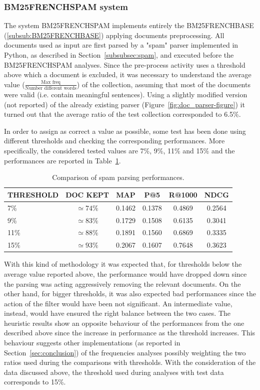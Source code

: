 \subsubsection{BM25FRENCHSPAM system}
\label{subsub:BM25FRENCHSPAM}
The system BM25FRENCHSPAM implements entirely the BM25FRENCHBASE (\ref{subsub:BM25FRENCHBASE}) applying documents preprocessing. All documents used as input are first parsed by a "spam" parser implemented in Python, as described in Section~\ref{subsubsec:spam}, and executed before the BM25FRENCHSPAM analyses. Since the pre-process activity uses a threshold above which a document is excluded, it was necessary to understand the average value (\(\frac{\text{Max freq}}{\text{Number different words}}\)) of the collection, assuming that most of the documents were valid (i.e. contain meaningful sentences). Using a slightly modified version (not reported) of the already existing parser (Figure~\ref{fig:doc_parser-figure}) it turned out that the average ratio of the test collection corresponded to 6.5\%. 
\par
In order to assign as correct a value as possible, some test has been done using different thresholds and checking the corresponding performances.  More specifically, the considered tested values are 7\%, 9\%, 11\% and 15\% and the performances are reported in Table~\ref{tab:spamparsingperf}.
\begin{center}
\begin{table}[tb]
\centering
\begin{tabular}{|l|c|c|c|c|c|} 
 \hline
   THRESHOLD & DOC KEPT & MAP & P@5 & R@1000 & NDCG\\
 \hline\hline
 7\% & \(\simeq 74\%\) & 0.1462 & 0.1378 & 0.4869 & 0.2564\\ 
 9\% & \(\simeq 83\%\) & 0.1729 & 0.1508 & 0.6135 & 0.3041\\
 11\% & \(\simeq 88\%\) & 0.1891 & 0.1560 & 0.6869 & 0.3335\\
 15\% & \(\simeq 93\%\) & 0.2067 & 0.1607 & 0.7648 & 0.3623\\ 
 \hline
\end{tabular}
\caption{Comparison of spam parsing performances.}
\label{tab:spamparsingperf}
\end{table}
\end{center}
\par
With this kind of methodology it was expected that, for thresholds below the average value reported above, the performance would have dropped down since the parsing was acting aggressively removing the relevant documents. On the other hand, for bigger thresholds, it was also expected bad performances since the action of the filter would have been not significant. An intermediate value, instead, would have ensured the right balance between the two cases. The heuristic results show an opposite behaviour  of the performances from the one described above since the increase in performance as the threshold increases. This behaviour suggests other implementations (as reported in Section~\ref{sec:conclusion}) of the frequencies analyses possibly weighting the two ratios used during the comparisons with thresholds. With the consideration of the data discussed above, the threshold used during analyses with test data corresponds to 15\%.    

